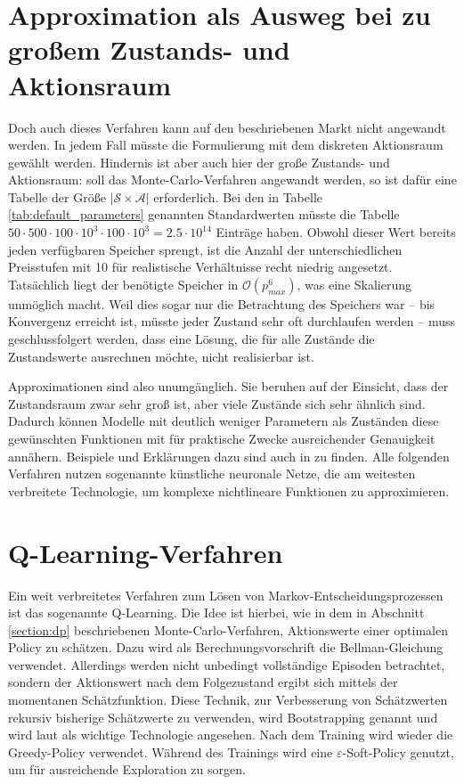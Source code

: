 \section{Approximation als Ausweg bei zu großem Zustands- und Aktionsraum}
Doch auch dieses Verfahren kann auf den beschriebenen Markt nicht angewandt werden.
In jedem Fall müsste die Formulierung mit dem diskreten Aktionsraum gewählt werden.
Hindernis ist aber auch hier der große Zustands- und Aktionsraum: soll das Monte-Carlo-Verfahren angewandt werden, so ist dafür eine Tabelle der Größe $|\mathcal{S} \times \mathcal{A}|$ erforderlich.
Bei den in Tabelle \ref{tab:default_parameters} genannten Standardwerten müsste die Tabelle $50 \cdot 500 \cdot 100 \cdot 10^3 \cdot 100 \cdot 10^3 = 2.5 \cdot 10^{14}$ Einträge haben.
Obwohl dieser Wert bereits jeden verfügbaren Speicher sprengt, ist die Anzahl der unterschiedlichen Preisstufen mit 10 für realistische Verhältnisse recht niedrig angesetzt.
Tatsächlich liegt der benötigte Speicher in $\mathcal{O}\left(p_{max}^6\right)$, was eine Skalierung unmöglich macht.
Weil dies sogar nur die Betrachtung des Speichers war -- bis Konvergenz erreicht ist, müsste jeder Zustand sehr oft durchlaufen werden -- muss geschlussfolgert werden, dass eine Lösung, die für alle Zustände die Zustandswerte ausrechnen möchte, nicht realisierbar ist.

Approximationen sind also unumgänglich.
Sie beruhen auf der Einsicht, dass der Zustandsraum zwar sehr groß ist, aber viele Zustände sich sehr ähnlich sind.
Dadurch können Modelle mit deutlich weniger Parametern als Zuständen diese gewünschten Funktionen  mit für praktische Zwecke ausreichender Genauigkeit annähern.
Beispiele und Erklärungen dazu sind auch in \cite{lapan2020deep} zu finden.
Alle folgenden Verfahren nutzen sogenannte künstliche neuronale Netze, die am weitesten verbreitete Technologie, um komplexe nichtlineare Funktionen zu approximieren.

\section{Q-Learning-Verfahren}
\label{section:qlearning}
Ein weit verbreitetes Verfahren zum Lösen von Markov-Entscheidungsprozessen ist das sogenannte Q-Learning.
Die Idee ist hierbei, wie in dem in Abschnitt \ref{section:dp} beschriebenen Monte-Carlo-Verfahren, Aktionswerte einer optimalen Policy zu schätzen.
Dazu wird als Berechnungsvorschrift die Bellman-Gleichung verwendet.
Allerdings werden nicht unbedingt vollständige Episoden betrachtet, sondern der Aktionswert nach dem Folgezustand ergibt sich mittels der momentanen Schätzfunktion.
Diese Technik, zur Verbesserung von Schätzwerten rekursiv bisherige Schätzwerte zu verwenden, wird Bootstrapping genannt und wird laut \cite{Sutton1998} als wichtige Technologie angesehen.
Nach dem Training wird wieder die Greedy-Policy verwendet.
Während des Trainings wird eine $\varepsilon$-Soft-Policy genutzt, um für ausreichende Exploration zu sorgen.

